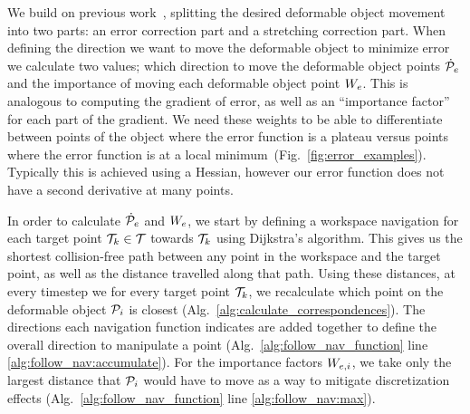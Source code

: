 We build on previous work~\cite{Berenson2013}, splitting the desired deformable object movement into two parts: an error correction part and a stretching correction part. When defining the direction we want to move the deformable object to minimize error we calculate two values; which direction to move the deformable object points $\dot{\mathcal{P}}_e$ and the importance of moving each deformable object point $W_e$. This is analogous to computing the gradient of error, as well as an ``importance factor'' for each part of the gradient. We need these weights to be able to differentiate between points of the object where the error function is a plateau versus points where the error function is at a local minimum~(Fig.~\ref{fig:error_examples}). Typically this is achieved using a Hessian, however our error function does not have a second derivative at many points. 

In order to calculate $\dot{\mathcal{P}}_e$ and $W_e$, we start by defining a workspace navigation for each target point $\mathcal{T}_k \in \mathcal{T}$ towards $\mathcal{T}_k$ using Dijkstra's algorithm. This gives us the shortest collision-free path between any point in the workspace and the target point, as well as the distance travelled along that path. Using these distances, at every timestep we for every target point $\mathcal{T}_k$, we recalculate which point on the deformable object $\mathcal{P}_i$ is closest (Alg.~\ref{alg:calculate_correspondences}). The directions each navigation function indicates are added together to define the overall direction to manipulate a point (Alg.~\ref{alg:follow_nav_function} line \ref{alg:follow_nav:accumulate}). For the importance factors $W_{e,i}$, we take only the largest distance that $\mathcal{P}_i$ would have to move as a way to mitigate discretization effects (Alg.~\ref{alg:follow_nav_function} line \ref{alg:follow_nav:max}).
